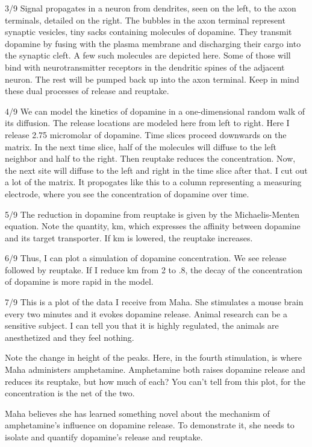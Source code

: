 \documentclass[11pt]{article}
\begin{document}
3/9
Signal propagates in a neuron from dendrites, seen on the left, to the
axon terminals, detailed on the right. The bubbles in the axon
terminal represent synaptic vesicles, tiny sacks containing molecules
of dopamine. They transmit dopamine by fusing with the plasma membrane
and discharging their cargo into the synaptic cleft. A few such
molecules are depicted here. Some of those will bind with
neurotransmitter receptors in the dendritic spines of the adjacent
neuron. The rest will be pumped back up into the axon terminal. Keep
in mind these dual processes of release and reuptake.

4/9 We can model the kinetics of dopamine in a one-dimensional random
walk of its diffusion. The release locations are modeled here from
left to right. Here I release 2.75 micromolar of dopamine. Time slices
proceed downwards on the matrix. In the next time slice, half of the
molecules will diffuse to the left neighbor and half to the
right. Then reuptake reduces the concentration. Now, the next site
will diffuse to the left and right in the time slice after that. I cut
out a lot of the matrix. It propogates like this to a column
representing a measuring electrode, where you see the concentration of
dopamine over time.

5/9
The reduction in dopamine from reuptake is given by the
Michaelis-Menten equation. Note the quantity, km, which expresses the
affinity between dopamine and its target transporter. If km is
lowered, the reuptake increases.

6/9 Thus, I can plot a simulation of dopamine concentration. We see
release followed by reuptake. If I reduce km from 2 to .8, the decay
of the concentration of dopamine is more rapid in the model.

7/9 This is a plot of the data I receive from Maha. She stimulates a
mouse brain every two minutes and it evokes dopamine release. Animal
research can be a sensitive subject. I can tell you that it is highly
regulated, the animals are anesthetized and they feel nothing.

Note the change in height of the peaks. Here, in the fourth
stimulation, is where Maha administers amphetamine. Amphetamine both
raises dopamine release and reduces its reuptake, but how much of
each?  You can't tell from this plot, for the concentration is the net
of the two.

Maha believes she has learned something novel about the mechanism of
amphetamine's influence on dopamine release. To demonstrate it, she
needs to isolate and quantify dopamine's release and reuptake.
\end{document}

